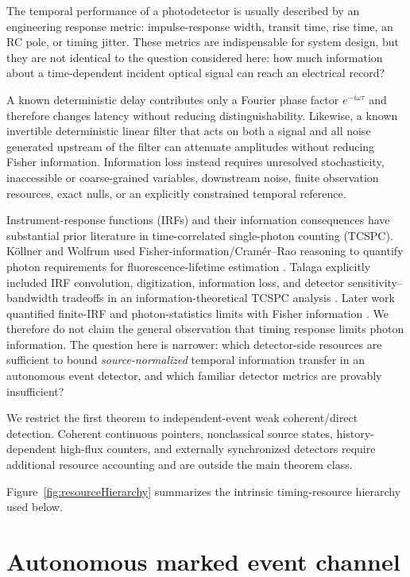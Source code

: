 \documentclass[aps,prapplied,preprint,nofootinbib]{revtex4-2}
\begin{document}
The temporal performance of a photodetector is usually described by an engineering response metric: impulse-response width, transit time, rise time, an RC pole, or timing jitter. These metrics are indispensable for system design, but they are not identical to the question considered here: how much information about a time-dependent incident optical signal can reach an electrical record?

A known deterministic delay contributes only a Fourier phase factor $e^{-i\omega\tau}$ and therefore changes latency without reducing distinguishability. Likewise, a known invertible deterministic linear filter that acts on both a signal and all noise generated upstream of the filter can attenuate amplitudes without reducing Fisher information. Information loss instead requires unresolved stochasticity, inaccessible or coarse-grained variables, downstream noise, finite observation resources, exact nulls, or an explicitly constrained temporal reference.

Instrument-response functions (IRFs) and their information consequences have substantial prior literature in time-correlated single-photon counting (TCSPC). K\"ollner and Wolfrum used Fisher-information/Cram\'er--Rao reasoning to quantify photon requirements for fluorescence-lifetime estimation \cite{KollnerWolfrum1992}. Talaga explicitly included IRF convolution, digitization, information loss, and detector sensitivity--bandwidth tradeoffs in an information-theoretical TCSPC analysis \cite{Talaga2009}. Later work quantified finite-IRF and photon-statistics limits with Fisher information \cite{Bouchet2019,TrinhEsposito2021}. We therefore do not claim the general observation that timing response limits photon information. The question here is narrower: which detector-side resources are sufficient to bound \emph{source-normalized} temporal information transfer in an autonomous event detector, and which familiar detector metrics are provably insufficient?

We restrict the first theorem to independent-event weak coherent/direct detection. Coherent continuous pointers, nonclassical source states, history-dependent high-flux counters, and externally synchronized detectors require additional resource accounting and are outside the main theorem class.

Figure~\ref{fig:resourceHierarchy} summarizes the intrinsic timing-resource hierarchy used below.



\section{Autonomous marked event channel}
\end{document}
